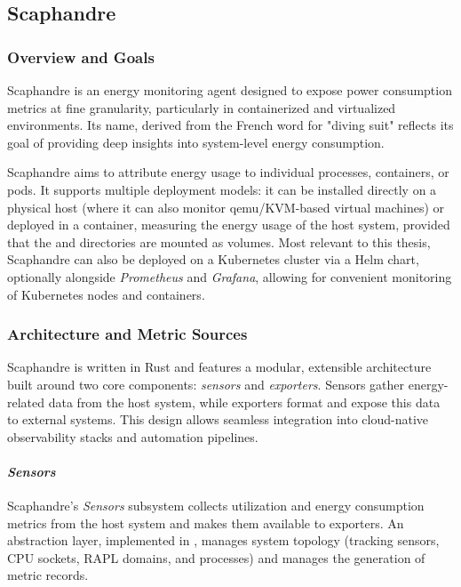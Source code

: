 \subsection{Scaphandre}
\label{sec:scaphandre}

\subsubsection{Overview and Goals}
\label{sec:scaphandre-overview}

Scaphandre\parencite{scaphandre_github} is an energy monitoring agent designed to expose power consumption metrics at fine granularity, particularly in containerized and virtualized environments. Its name, derived from the French word for "diving suit" reflects its goal of providing deep insights into system-level energy consumption.

Scaphandre aims to attribute energy usage to individual processes, containers, or pods. It supports multiple deployment models: it can be installed directly on a physical host (where it can also monitor qemu/KVM-based virtual machines) or deployed in a container, measuring the energy usage of the host system, provided that the  and  directories are mounted as volumes. Most relevant to this thesis, Scaphandre can also be deployed on a Kubernetes cluster via a Helm chart, optionally alongside \textit{Prometheus} and \textit{Grafana}, allowing for convenient monitoring of Kubernetes nodes and containers.

\subsubsection{Architecture and Metric Sources}
\label{sec:scaphandre-architecture}

Scaphandre is written in Rust and features a modular, extensible architecture built around two core components: \textit{sensors} and \textit{exporters}. Sensors gather energy-related data from the host system, while exporters format and expose this data to external systems. This design allows seamless integration into cloud-native observability stacks and automation pipelines.

\paragraph{\textit{Sensors}}

Scaphandre’s \textit{Sensors} subsystem collects utilization and energy consumption metrics from the host system and makes them available to exporters. An abstraction layer, implemented in , manages system topology (tracking sensors, CPU sockets, RAPL domains, and processes) and manages the generation of metric records.

